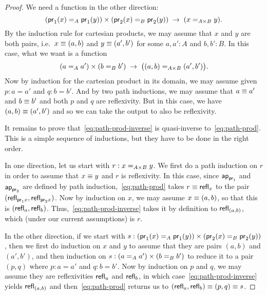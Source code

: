 \begin{proof}
  We need a function in the other direction:
  \begin{equation}
    (\id[A]{\proj1(x)}{\proj1(y)}) \times (\id[B]{\proj2(x)}{\proj2(y)}) \;\to\; (\id[A\times B]{x}{y}) .\label{eq:path-prod-inverse}
  \end{equation}
  By the induction rule for cartesian products, we may assume that $x$ and $y$ are both pairs, i.e.\ $x\jdeq (a,b)$ and $y\jdeq (a',b')$ for some $a,a':A$ and $b,b':B$.
  In this case, what we want is a function
  \begin{equation*}
    (\id[A]{a}{a'}) \times (\id[B]{b}{b'}) \;\to\; \big(\id[A\times B]{(a,b)}{(a',b')}\big).
  \end{equation*}
  Now by induction for the cartesian product in its domain, we may assume given $p:a=a'$ and $q:b=b'$.
  And by two path inductions, we may assume that $a\jdeq a'$ and $b\jdeq b'$ and both $p$ and $q$ are reflexivity.
  But in this case, we have $(a,b)\jdeq(a',b')$ and so we can take the output to also be reflexivity.

  It remains to prove that~\eqref{eq:path-prod-inverse} is quasi-inverse to~\eqref{eq:path-prod}.
  This is a simple sequence of inductions, but they have to be done in the right order.

  In one direction, let us start with $r:\id[A\times B]{x}{y}$.
  We first do a path induction on $r$ in order to assume that $x\jdeq y$ and $r$ is reflexivity.
  In this case, since $\apfunc{\proj1}$ and $\apfunc{\proj2}$ are defined by path induction,~\eqref{eq:path-prod} takes $r\jdeq \refl{x}$ to the pair $(\refl{\proj1x},\refl{\proj2x})$.
  Now by induction on $x$, we may assume $x\jdeq (a,b)$, so that this is $(\refl a, \refl b)$.
  Thus,~\eqref{eq:path-prod-inverse} takes it by definition to $\refl{(a,b)}$, which (under our current assumptions) is $r$.
  
  In the other direction, if we start with $s:(\id[A]{\proj1(x)}{\proj1(y)}) \times (\id[B]{\proj2(x)}{\proj2(y)})$, then we first do induction on $x$ and $y$ to assume that they are pairs $(a,b)$ and $(a',b')$, and then induction on $s:(\id[A]{a}{a'}) \times (\id[B]{b}{b'})$ to reduce it to a pair $(p,q)$ where $p:a=a'$ and $q:b=b'$.
  Now by induction on $p$ and $q$, we may assume they are reflexivities $\refl a$ and $\refl b$, in which case~\eqref{eq:path-prod-inverse} yields $\refl{(a,b)}$ and then~\eqref{eq:path-prod} returns us to $(\refl a,\refl b)\jdeq (p,q)\jdeq s$.
\end{proof}

